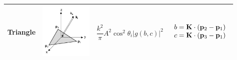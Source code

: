 \begin{table}[h]
\begin{center}
\begin{tabular}{|p{1.6cm}|p{2.8cm}|c|p{2.9cm}|}
Triangle & \parbox[c]{1em}{\includegraphics[width=1in]{Kirchhoff/Figures/Triangle}}  & $\dfrac{k^2}{\pi}  A^2 \cos^2\theta_i \vert g(b,c)\vert^2 $ & \footnotesize$\begin{array}{l}
b = \mathbf{K} \cdot (\mathbf{p}_2 - \mathbf{p}_1) \\
c = \mathbf{K} \cdot (\mathbf{p}_3 - \mathbf{p}_1) \\
\end{array}$ \\   \hline
\end{tabular}
\end{center}
\end{table}%
 






